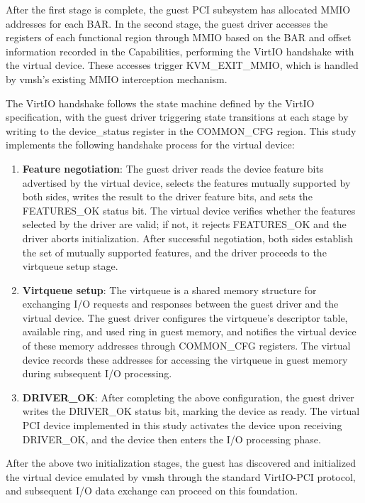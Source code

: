 \begin{ZhChapter}
After the first stage is complete, the guest PCI subsystem has allocated MMIO addresses for each BAR. In the second stage, the guest driver accesses the registers of each functional region through MMIO based on the BAR and offset information recorded in the Capabilities, performing the VirtIO handshake with the virtual device. These accesses trigger KVM\_EXIT\_MMIO, which is handled by vmsh's existing MMIO interception mechanism.

The VirtIO handshake follows the state machine defined by the VirtIO specification, with the guest driver triggering state transitions at each stage by writing to the device\_status register in the COMMON\_CFG region. This study implements the following handshake process for the virtual device:

\begin{enumerate}
    \item \textbf{Feature negotiation}: The guest driver reads the device feature bits advertised by the virtual device, selects the features mutually supported by both sides, writes the result to the driver feature bits, and sets the FEATURES\_OK status bit. The virtual device verifies whether the features selected by the driver are valid; if not, it rejects FEATURES\_OK and the driver aborts initialization. After successful negotiation, both sides establish the set of mutually supported features, and the driver proceeds to the virtqueue setup stage.

    \item \textbf{Virtqueue setup}: The virtqueue is a shared memory structure for exchanging I/O requests and responses between the guest driver and the virtual device. The guest driver configures the virtqueue's descriptor table, available ring, and used ring in guest memory, and notifies the virtual device of these memory addresses through COMMON\_CFG registers. The virtual device records these addresses for accessing the virtqueue in guest memory during subsequent I/O processing.

    \item \textbf{DRIVER\_OK}: After completing the above configuration, the guest driver writes the DRIVER\_OK status bit, marking the device as ready. The virtual PCI device implemented in this study activates the device upon receiving DRIVER\_OK, and the device then enters the I/O processing phase.
\end{enumerate}

After the above two initialization stages, the guest has discovered and initialized the virtual device emulated by vmsh through the standard VirtIO-PCI protocol, and subsequent I/O data exchange can proceed on this foundation.


\end{ZhChapter}
